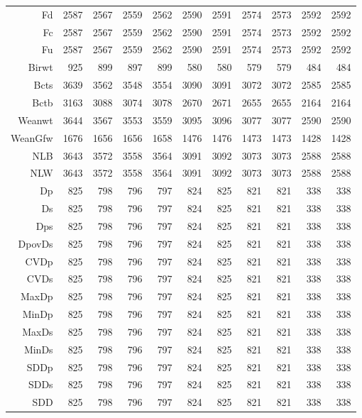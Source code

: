 \begin{table}[p]
\begin{tabular}{rrrrrrrrrrr}
  Fd & 2587 & 2567 & 2559 & 2562 & 2590 & 2591 & 2574 & 2573 & 2592 & 2592 \\ 
  Fc & 2587 & 2567 & 2559 & 2562 & 2590 & 2591 & 2574 & 2573 & 2592 & 2592 \\ 
  Fu & 2587 & 2567 & 2559 & 2562 & 2590 & 2591 & 2574 & 2573 & 2592 & 2592 \\ 
  Birwt & 925 & 899 & 897 & 899 & 580 & 580 & 579 & 579 & 484 & 484 \\ 
  Bcts & 3639 & 3562 & 3548 & 3554 & 3090 & 3091 & 3072 & 3072 & 2585 & 2585 \\ 
  Bctb & 3163 & 3088 & 3074 & 3078 & 2670 & 2671 & 2655 & 2655 & 2164 & 2164 \\ 
  Weanwt & 3644 & 3567 & 3553 & 3559 & 3095 & 3096 & 3077 & 3077 & 2590 & 2590 \\ 
  WeanGfw & 1676 & 1656 & 1656 & 1658 & 1476 & 1476 & 1473 & 1473 & 1428 & 1428 \\ 
  NLB & 3643 & 3572 & 3558 & 3564 & 3091 & 3092 & 3073 & 3073 & 2588 & 2588 \\ 
  NLW & 3643 & 3572 & 3558 & 3564 & 3091 & 3092 & 3073 & 3073 & 2588 & 2588 \\ 
  Dp & 825 & 798 & 796 & 797 & 824 & 825 & 821 & 821 & 338 & 338 \\ 
  Ds & 825 & 798 & 796 & 797 & 824 & 825 & 821 & 821 & 338 & 338 \\ 
  Dps & 825 & 798 & 796 & 797 & 824 & 825 & 821 & 821 & 338 & 338 \\ 
  DpovDs & 825 & 798 & 796 & 797 & 824 & 825 & 821 & 821 & 338 & 338 \\ 
  CVDp & 825 & 798 & 796 & 797 & 824 & 825 & 821 & 821 & 338 & 338 \\ 
  CVDs & 825 & 798 & 796 & 797 & 824 & 825 & 821 & 821 & 338 & 338 \\ 
  MaxDp & 825 & 798 & 796 & 797 & 824 & 825 & 821 & 821 & 338 & 338 \\ 
  MinDp & 825 & 798 & 796 & 797 & 824 & 825 & 821 & 821 & 338 & 338 \\ 
  MaxDs & 825 & 798 & 796 & 797 & 824 & 825 & 821 & 821 & 338 & 338 \\ 
  MinDs & 825 & 798 & 796 & 797 & 824 & 825 & 821 & 821 & 338 & 338 \\ 
  SDDp & 825 & 798 & 796 & 797 & 824 & 825 & 821 & 821 & 338 & 338 \\ 
  SDDs & 825 & 798 & 796 & 797 & 824 & 825 & 821 & 821 & 338 & 338 \\ 
  SDD & 825 & 798 & 796 & 797 & 824 & 825 & 821 & 821 & 338 & 338 \\ 

\end{tabular}
\end{table}
